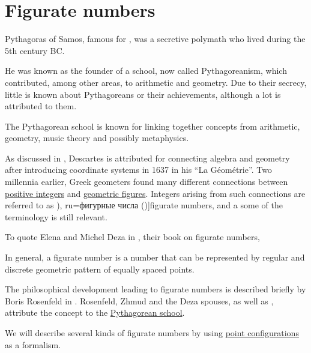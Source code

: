 \section{Figurate numbers}\label{sec:figurate_numbers}

\begin{remark}\label{rem:pythagoreanism}
  Pythagoras of Samos, famous for , was a secretive polymath who lived during the 5th century BC.

  He was known as the founder of a school, now called Pythagoreanism, which contributed, among other areas, to arithmetic and geometry. Due to their secrecy, little is known about Pythagoreans or their achievements, although a lot is attributed to them.

  The Pythagorean school is known for linking together concepts from arithmetic, geometry, music theory and possibly metaphysics.
\end{remark}

\begin{concept}\label{con:figurate_number}
  As discussed in , Descartes is attributed for connecting algebra and geometry after introducing coordinate systems in 1637 in his \enquote{La Géométrie}. Two millennia earlier, Greek geometers found many different connections between \hyperref[def:integers]{positive integers} and \hyperref[con:geometric_shape]{geometric figures}. Integers arising from such connections are referred to as \term[en=figurate number (\cite[xv]{Deza2012FigurateNumbers}), ru=фигурные числа (\cite[14]{АлександровМаркушевичХинчинИПр1963ЭнциклопедияТом4})]{figurate numbers}, and a some of the terminology is still relevant.

  To quote Elena and Michel Deza in \cite[xv]{Deza2012FigurateNumbers}, their book on figurate numbers,
  \begin{displayquote}
    In general, a figurate number is a number that can be represented by regular and discrete geometric pattern of equally spaced points.
  \end{displayquote}

  The philosophical development leading to figurate numbers is described briefly by Boris Rosenfeld in \cite{АлександровМаркушевичХинчинИПр1963ЭнциклопедияТом4}. Rosenfeld, Zhmud and the Deza spouses, as well as , attribute the concept to the \hyperref[rem:pythagoreanism]{Pythagorean school}.

  We will describe several kinds of figurate numbers by using \hyperref[def:point_configuration]{point configurations} as a formalism.
\end{concept}

